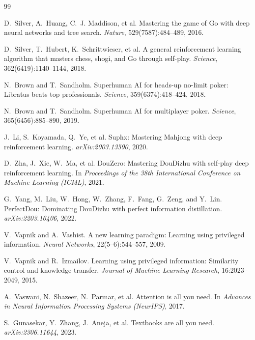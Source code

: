 \documentclass[11pt]{article}
\begin{document}
\begin{thebibliography}{99}

D.~Silver, A.~Huang, C.~J. Maddison, et al.
\newblock Mastering the game of Go with deep neural networks and tree search.
\newblock \emph{Nature}, 529(7587):484--489, 2016.

D.~Silver, T.~Hubert, K.~Schrittwieser, et al.
\newblock A general reinforcement learning algorithm that masters chess, shogi, and Go through self-play.
\newblock \emph{Science}, 362(6419):1140--1144, 2018.

N.~Brown and T.~Sandholm.
\newblock Superhuman AI for heads-up no-limit poker: Libratus beats top professionals.
\newblock \emph{Science}, 359(6374):418--424, 2018.

N.~Brown and T.~Sandholm.
\newblock Superhuman AI for multiplayer poker.
\newblock \emph{Science}, 365(6456):885--890, 2019.

J.~Li, S.~Koyamada, Q.~Ye, et al.
\newblock Suphx: Mastering Mahjong with deep reinforcement learning.
\newblock \emph{arXiv:2003.13590}, 2020.

D.~Zha, J.~Xie, W.~Ma, et al.
\newblock DouZero: Mastering DouDizhu with self-play deep reinforcement learning.
\newblock In \emph{Proceedings of the 38th International Conference on Machine Learning (ICML)}, 2021.

G.~Yang, M.~Liu, W.~Hong, W.~Zhang, F.~Fang, G.~Zeng, and Y.~Lin.
\newblock PerfectDou: Dominating DouDizhu with perfect information distillation.
\newblock \emph{arXiv:2203.16406}, 2022.

V.~Vapnik and A.~Vashist.
\newblock A new learning paradigm: Learning using privileged information.
\newblock \emph{Neural Networks}, 22(5--6):544--557, 2009.

V.~Vapnik and R.~Izmailov.
\newblock Learning using privileged information: Similarity control and knowledge transfer.
\newblock \emph{Journal of Machine Learning Research}, 16:2023--2049, 2015.

A.~Vaswani, N.~Shazeer, N.~Parmar, et al.
\newblock Attention is all you need.
\newblock In \emph{Advances in Neural Information Processing Systems (NeurIPS)}, 2017.

S.~Gunasekar, Y.~Zhang, J.~Aneja, et al.
\newblock Textbooks are all you need.
\newblock \emph{arXiv:2306.11644}, 2023.

\end{thebibliography}
\end{document}
